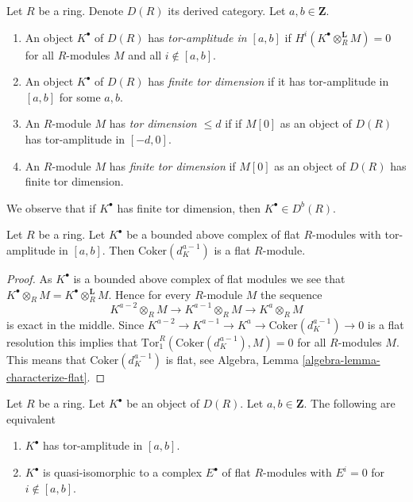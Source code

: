 \begin{definition}
\label{definition-tor-amplitude}
Let $R$ be a ring. Denote $D(R)$ its derived category.
Let $a, b \in \mathbf{Z}$.
\begin{enumerate}
\item An object $K^\bullet$ of $D(R)$ has
{\it tor-amplitude in $[a, b]$}
if $H^i(K^\bullet \otimes_R^\mathbf{L} M) = 0$ for all $R$-modules
$M$ and all $i \not \in [a, b]$.
\item An object $K^\bullet$ of $D(R)$ has {\it finite tor dimension}
if it has tor-amplitude in $[a, b]$ for some $a, b$.
\item An $R$-module $M$ has {\it tor dimension $\leq d$} if
if $M[0]$ as an object of $D(R)$ has tor-amplitude in $[-d, 0]$.
\item An $R$-module $M$ has {\it finite tor dimension}
if $M[0]$ as an object of $D(R)$ has finite tor dimension.
\end{enumerate}
\end{definition}

\noindent
We observe that if $K^\bullet$ has finite tor dimension,
then $K^\bullet \in D^b(R)$.

\begin{lemma}
\label{lemma-last-one-flat}
Let $R$ be a ring. Let $K^\bullet$ be a bounded above complex of
flat $R$-modules with tor-amplitude in $[a, b]$.
Then $\text{Coker}(d_K^{a - 1})$ is a flat $R$-module.
\end{lemma}

\begin{proof}
As $K^\bullet$ is a bounded above complex of flat modules we see
that $K^\bullet \otimes_R M = K^\bullet \otimes_R^{\mathbf{L}} M$.
Hence for every $R$-module $M$ the sequence
$$
K^{a - 2} \otimes_R M \to K^{a - 1} \otimes_R M \to K^a \otimes_R M
$$
is exact in the middle. Since
$K^{a - 2} \to K^{a - 1} \to K^a \to \text{Coker}(d_K^{a - 1}) \to 0$
is a flat resolution this implies that
$\text{Tor}_1^R(\text{Coker}(d_K^{a - 1}), M) = 0$
for all $R$-modules $M$. This means that
$\text{Coker}(d_K^{a - 1})$ is flat, see
Algebra, Lemma \ref{algebra-lemma-characterize-flat}.
\end{proof}

\begin{lemma}
\label{lemma-tor-amplitude}
Let $R$ be a ring. Let $K^\bullet$ be an object of $D(R)$.
Let $a, b \in \mathbf{Z}$. The following are equivalent
\begin{enumerate}
\item $K^\bullet$ has tor-amplitude in $[a, b]$.
\item $K^\bullet$ is quasi-isomorphic to a complex
$E^\bullet$ of flat $R$-modules with $E^i = 0$ for $i \not \in [a, b]$.
\end{enumerate}
\end{lemma}

